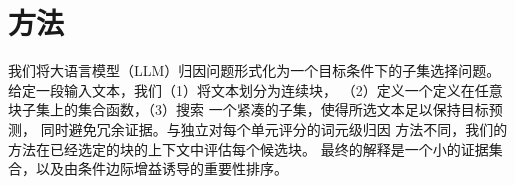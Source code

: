 \section{方法}

我们将大语言模型（LLM）归因问题形式化为一个目标条件下的子集选择问题。
给定一段输入文本，我们（1）将文本划分为连续块，
（2）定义一个定义在任意块子集上的集合函数，（3）搜索
一个紧凑的子集，使得所选文本足以保持目标预测，
同时避免冗余证据。与独立对每个单元评分的词元级归因
方法不同，我们的方法在已经选定的块的上下文中评估每个候选块。
最终的解释是一个小的证据集合，以及由条件边际增益诱导的重要性排序。


